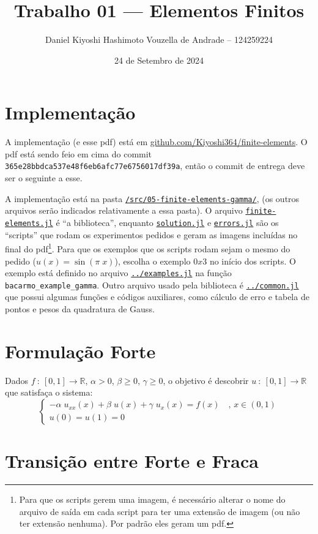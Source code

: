 \documentclass[a4paper]{article}
\title{Trabalho 01 --- Elementos Finitos}
\author{Daniel Kiyoshi Hashimoto Vouzella de Andrade -- 124259224}
\date{24 de Setembro de 2024}
\newcommand{\linkfileraw}[2]{\href{run:../../#1}{\texttt{#2}}}
\newcommand{\linkfile}[2][src/05-finite-elements-gamma/]{\linkfileraw{#1#2}{#2}}
\newcommand{\typ}{\::\:}
\begin{document}
\maketitle

\setcounter{section}{-1}
\section{Implementação}

A implementação (e esse pdf) está em
\href{https://github.com/Kiyoshi364/finite-elements}{github.com/Kiyoshi364/finite-elements}.
O pdf está sendo feio em cima do commit
\texttt{365e28bbdca537e48f6eb6afc77e6756017df39a},
então o commit de entrega deve ser o seguinte a esse.

A implementação está na pasta
\linkfileraw{/src/05-finite-elements-gamma/}{/src/05-finite-elements-gamma/},
(os outros arquivos serão indicados
relativamente a essa pasta).
O arquivo \linkfile{finite-elements.jl}
é ``a biblioteca'',
enquanto
\linkfile{solution.jl} e \linkfile{errors.jl}
são os ``scripts'' que rodam os experimentos pedidos
e geram as imagens incluídas no final do pdf\footnote{
Para que os scripts gerem uma imagem,
é necessário alterar o nome do arquivo de saída
em cada script para ter uma extensão de imagem
(ou não ter extensão nenhuma).
Por padrão eles geram um pdf.
}.
Para que os exemplos que os scripts rodam
sejam o mesmo do pedido
(\(u(x) = \sin(\pi \; x)\)),
escolha o exemplo \(0x3\)
no início dos scripts.
O exemplo está definido
no arquivo
\linkfile{../examples.jl}
na função \texttt{bacarmo\_example\_gamma}.
Outro arquivo usado pela biblioteca é
\linkfile{../common.jl}
que possui algumas funções e códigos auxiliares,
como cálculo de erro e
tabela de pontos e pesos da quadratura de Gauss.

\section{Formulação Forte}

Dados
\(f \typ [0, 1] \to \mathbb{R}\),
\(\alpha > 0\),
\(\beta \ge 0\),
\(\gamma \ge 0\),
o objetivo é descobrir \(u \typ [0, 1] \to \mathbb{R}\)
que satisfaça o sistema:
\[
    \begin{cases}
        - \alpha \; u_{xx}(x) + \beta \; u(x) + \gamma \; u_{x}(x) = f(x)
            \quad\text{, } x \in (0, 1) \\
        u(0) = u(1) = 0
    \end{cases}
\]

\section{Transição entre Forte e Fraca}
\end{document}
